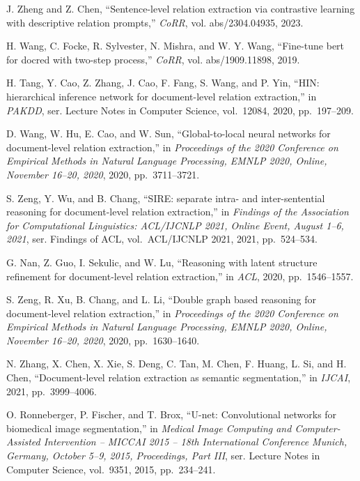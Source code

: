 \begin{enumerate}[leftmargin=2em,label={[\arabic*]}]
\item J. Zheng and Z. Chen, ``Sentence-level relation extraction via contrastive learning with descriptive relation prompts,'' \textit{CoRR}, vol. abs/2304.04935, 2023.

\item H. Wang, C. Focke, R. Sylvester, N. Mishra, and W. Y. Wang, ``Fine-tune bert for docred with two-step process,'' \textit{CoRR}, vol. abs/1909.11898, 2019.

\item H. Tang, Y. Cao, Z. Zhang, J. Cao, F. Fang, S. Wang, and P. Yin, ``HIN: hierarchical inference network for document-level relation extraction,'' in \textit{PAKDD}, ser. Lecture Notes in Computer Science, vol.~12084, 2020, pp.~197--209.

\item D. Wang, W. Hu, E. Cao, and W. Sun, ``Global-to-local neural networks for document-level relation extraction,'' in \textit{Proceedings of the 2020 Conference on Empirical Methods in Natural Language Processing, EMNLP 2020, Online, November 16--20, 2020}, 2020, pp.~3711--3721.

\item S. Zeng, Y. Wu, and B. Chang, ``SIRE: separate intra- and inter-sentential reasoning for document-level relation extraction,'' in \textit{Findings of the Association for Computational Linguistics: ACL/IJCNLP 2021, Online Event, August 1--6, 2021}, ser. Findings of ACL, vol.~ACL/IJCNLP 2021, 2021, pp.~524--534.

\item G. Nan, Z. Guo, I. Sekulic, and W. Lu, ``Reasoning with latent structure refinement for document-level relation extraction,'' in \textit{ACL}, 2020, pp.~1546--1557.

\item S. Zeng, R. Xu, B. Chang, and L. Li, ``Double graph based reasoning for document-level relation extraction,'' in \textit{Proceedings of the 2020 Conference on Empirical Methods in Natural Language Processing, EMNLP 2020, Online, November 16--20, 2020}, 2020, pp.~1630--1640.

\item N. Zhang, X. Chen, X. Xie, S. Deng, C. Tan, M. Chen, F. Huang, L. Si, and H. Chen, ``Document-level relation extraction as semantic segmentation,'' in \textit{IJCAI}, 2021, pp.~3999--4006.

\item O. Ronneberger, P. Fischer, and T. Brox, ``U-net: Convolutional networks for biomedical image segmentation,'' in \textit{Medical Image Computing and Computer-Assisted Intervention -- MICCAI 2015 -- 18th International Conference Munich, Germany, October 5--9, 2015, Proceedings, Part III}, ser. Lecture Notes in Computer Science, vol.~9351, 2015, pp.~234--241.


\end{enumerate}
